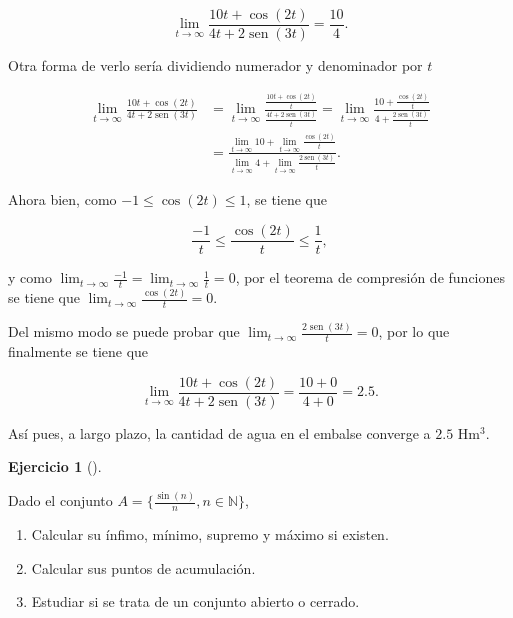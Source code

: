\documentclass[
  spanish,
  a4paper,
]{scrreport}
\providecommand{\tightlist}{%
  \setlength{\itemsep}{0pt}\setlength{\parskip}{0pt}}
\theoremstyle{definition}
\newtheorem{exercise}{Ejercicio}[chapter]
\theoremstyle{remark}
\begin{document}
\begin{tcolorbox}
\[
\lim_{t\to\infty} \frac{10t+\cos(2t)}{4t+2\operatorname{sen}(3t)} = \frac{10}{4}.
\]

Otra forma de verlo sería dividiendo numerador y denominador por \(t\)

\begin{align*}
\lim_{t\to\infty} \frac{10t+\cos(2t)}{4t+2\operatorname{sen}(3t)} 
&= \lim_{t\to\infty} \frac{\frac{10t+\cos(2t)}{t}}{\frac{4t+2\operatorname{sen}(3t)}{t}} 
= \lim_{t\to\infty} \frac{10 + \frac{\cos(2t)}{t}}{4 + \frac{2\operatorname{sen}(3t)}{t}} \\
&= \frac{\lim_{t\to\infty}10 +\lim_{t\to\infty} \frac{\cos(2t)}{t}}{\lim_{t\to\infty}4 + \lim_{t\to\infty}\frac{2\operatorname{sen}(3t)}{t}}.
\end{align*}

Ahora bien, como \(-1\leq \cos(2t)\leq 1\), se tiene que

\[
\frac{-1}{t}\leq \frac{\cos(2t)}{t}\leq \frac{1}{t},
\]

y como
\(\lim_{t\to\infty} \frac{-1}{t} = \lim_{t\to\infty} \frac{1}{t} = 0\),
por el teorema de compresión de funciones se tiene que
\(\lim_{t\to\infty} \frac{\cos(2t)}{t} = 0\).

Del mismo modo se puede probar que
\(\lim_{t\to\infty} \frac{2\operatorname{sen}(3t)}{t} =0\), por lo que
finalmente se tiene que

\[
\lim_{t\to\infty} \frac{10t+\cos(2t)}{4t+2\operatorname{sen}(3t)} 
= \frac{10+0}{4+0} = 2.5.
\]

Así pues, a largo plazo, la cantidad de agua en el embalse converge a
\(2.5\) Hm\(^3\).

\end{tcolorbox}

\begin{exercise}[]\protect\hypertarget{exr-3}{}\label{exr-3}

Dado el conjunto
\(A=\{\frac{\operatorname{sin}(n)}{n}, n\in\mathbb{N}\}\),

\begin{enumerate}
\def\labelenumi{\alph{enumi}.}
\tightlist
\item
  Calcular su ínfimo, mínimo, supremo y máximo si existen.
\item
  Calcular sus puntos de acumulación.
\item
  Estudiar si se trata de un conjunto abierto o cerrado.
\end{enumerate}

\end{exercise}
\end{document}
